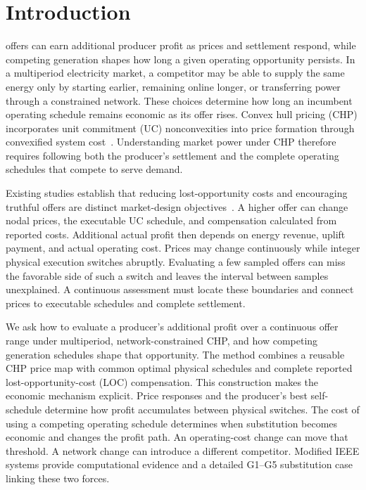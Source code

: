\documentclass[journal]{IEEEtran}
\begin{document}
\section{Introduction}
 offers can earn additional producer profit as prices and settlement respond, while competing generation shapes how long a given operating opportunity persists. In a multiperiod electricity market, a competitor may be able to supply the same energy only by starting earlier, remaining online longer, or transferring power through a constrained network. These choices determine how long an incumbent operating schedule remains economic as its offer rises. Convex hull pricing (CHP) incorporates unit commitment (UC) nonconvexities into price formation through convexified system cost~\cite{gribik2007,hua2017}. Understanding market power under CHP therefore requires following both the producer's settlement and the complete operating schedules that compete to serve demand.

Existing studies establish that reducing lost-opportunity costs and encouraging truthful offers are distinct market-design objectives~\cite{sun2021strategic,wang2023incentive}. A higher offer can change nodal prices, the executable UC schedule, and compensation calculated from reported costs. Additional actual profit then depends on energy revenue, uplift payment, and actual operating cost. Prices may change continuously while integer physical execution switches abruptly. Evaluating a few sampled offers can miss the favorable side of such a switch and leaves the interval between samples unexplained. A continuous assessment must locate these boundaries and connect prices to executable schedules and complete settlement.

We ask how to evaluate a producer's additional profit over a continuous offer range under multiperiod, network-constrained CHP, and how competing generation schedules shape that opportunity. The method combines a reusable CHP price map with common optimal physical schedules and complete reported lost-opportunity-cost (LOC) compensation. This construction makes the economic mechanism explicit. Price responses and the producer's best self-schedule determine how profit accumulates between physical switches. The cost of using a competing operating schedule determines when substitution becomes economic and changes the profit path. An operating-cost change can move that threshold. A network change can introduce a different competitor. Modified IEEE systems provide computational evidence and a detailed G1--G5 substitution case linking these two forces.
\end{document}
